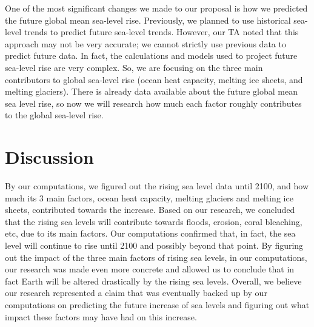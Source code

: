 \documentclass[fontsize=11pt]{article}
\begin{document}
One of the most significant changes we made to our proposal is how we predicted the future global mean sea-level rise. Previously, we planned to use historical sea-level trends to predict future sea-level trends. However, our TA noted that this approach may not be very accurate; we cannot strictly use previous data to predict future data. In fact, the calculations and models used to project future sea-level rise are very complex. So, we are focusing on the three main contributors to global sea-level rise (ocean heat capacity, melting ice sheets, and melting glaciers). There is already data available about the future global mean sea level rise, so now we will research how much each factor roughly contributes to the global sea-level rise.

\section*{Discussion}
By our computations, we figured out the rising sea level data until 2100, and how much its 3 main factors, ocean heat capacity, melting glaciers and melting ice sheets, contributed towards the increase. Based on our research, we concluded that the rising sea levels will contribute towards floods, erosion, coral bleaching, etc, due to its main factors. Our computations confirmed that, in fact, the sea level will continue to rise until 2100 and possibly beyond that point. By figuring out the impact of the three main factors of rising sea levels, in our computations, our research was made even more concrete and allowed us to conclude that in fact Earth will be altered drastically by the rising sea levels. Overall, we believe our research represented a claim that was eventually backed up by our computations on predicting the future increase of sea levels and figuring out what impact these factors may have had on this increase.\\
\end{document}
